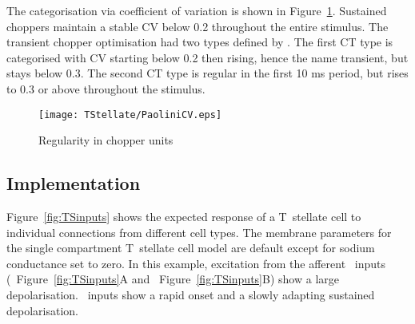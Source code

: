 The categorisation via coefficient of variation is shown in Figure~\ref{fig:PaoliniCVdata}.
Sustained choppers maintain a stable CV below 0.2 throughout the entire stimulus. The transient chopper optimisation had two types defined by \citep{PaoliniClareyEtAl:2005}.
The first CT type is categorised with CV starting below 0.2 then rising, hence the name transient, but stays below 0.3.
The second CT type is regular in the first 10 ms period, but rises to 0.3 or above throughout the stimulus.

\begin{figure}[htb]
\centering%
\texttt{[image: TStellate/PaoliniCV.eps]}
\caption{Regularity in chopper units \citep[Data reproduced from Fig.~2,~][]{PaoliniClareyEtAl:2005}}
\label{fig:PaoliniCVdata}
\end{figure}


\subsection{Implementation}




Figure~\ref{fig:TSinputs} shows the expected response of a T~stellate cell to individual connections from different cell types.
The membrane parameters for the single compartment T~stellate cell model are default except for sodium conductance set to zero.
In this example, excitation from the afferent \ANF~inputs (\LSR~Figure~\ref{fig:TSinputs}A and \HSR~Figure~\ref{fig:TSinputs}B) show a large depolarisation.
\HSR~inputs show a rapid onset and a slowly adapting sustained depolarisation.




